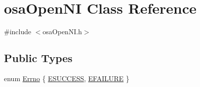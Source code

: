 \hypertarget{classosa_open_n_i}{}\section{osa\+Open\+N\+I Class Reference}
\label{classosa_open_n_i}


{\ttfamily \#include $<$osa\+Open\+N\+I.\+h$>$}

\subsection*{Public Types}
\begin{DoxyCompactItemize}
\item 
enum \hyperlink{classosa_open_n_i_a9f02bd17e25b1ee362b08c5620e307db}{Errno} \{ \hyperlink{classosa_open_n_i_a9f02bd17e25b1ee362b08c5620e307dba78d51d697ce0176897623cb3094bb2b2}{E\+S\+U\+C\+C\+E\+S\+S}, 
\hyperlink{classosa_open_n_i_a9f02bd17e25b1ee362b08c5620e307dba4eb89ca8c5addf282144176f9d013b57}{E\+F\+A\+I\+L\+U\+R\+E}
 \}
\end{DoxyCompactItemize}
